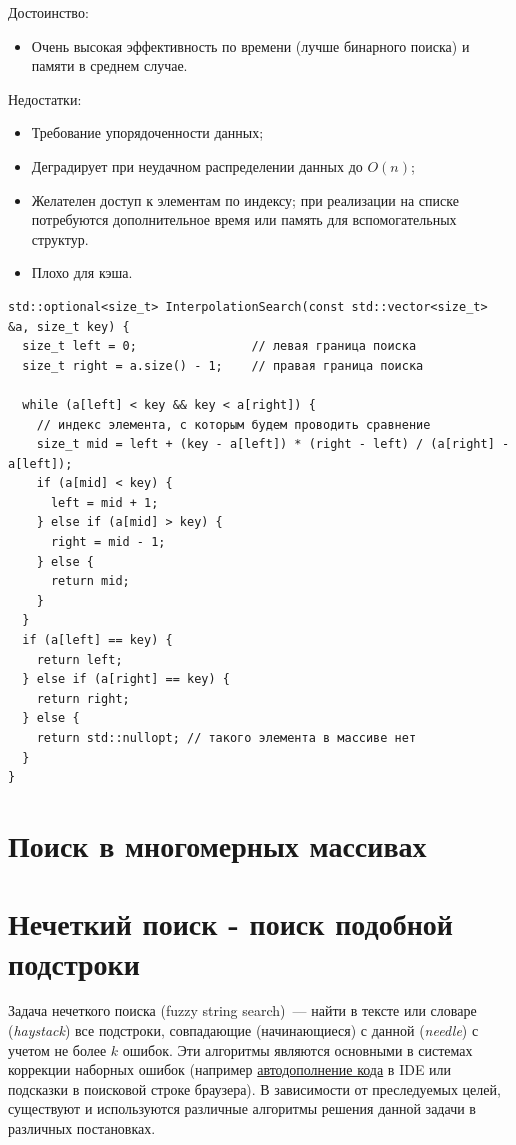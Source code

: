 Достоинство:
\begin{itemize}
  \item Очень высокая эффективность по времени (лучше бинарного поиска) и памяти  в среднем случае.
\end{itemize}
Недостатки:
\begin{itemize}
  \item Требование упорядоченности данных; 
  \item Деградирует при неудачном распределении данных до $O(n)$;
  \item Желателен доступ к элементам по индексу; при реализации на
  списке потребуются дополнительное время или память для
  вспомогательных структур.
  \item Плохо для кэша.
\end{itemize}

\begin{verbatim}
std::optional<size_t> InterpolationSearch(const std::vector<size_t> &a, size_t key) {
  size_t left = 0;                // левая граница поиска
  size_t right = a.size() - 1;    // правая граница поиска 

  while (a[left] < key && key < a[right]) {
    // индекс элемента, с которым будем проводить сравнение 
    size_t mid = left + (key - a[left]) * (right - left) / (a[right] - a[left]);
    if (a[mid] < key) {
      left = mid + 1;
    } else if (a[mid] > key) {
      right = mid - 1;
    } else {
      return mid;
    }
  }
  if (a[left] == key) {
    return left;
  } else if (a[right] == key) {
    return right;
  } else {
    return std::nullopt; // такого элемента в массиве нет
  }
}
\end{verbatim}

\section{Поиск в многомерных массивах}
\section{Нечеткий поиск - поиск подобной подстроки}
Задача нечеткого поиска (fuzzy string search)~--- найти в тексте или словаре (\textit{haystack}) все подстроки, совпадающие
(начинающиеся) с данной (\textit{needle}) с учетом не более \(k\) ошибок.
Эти алгоритмы являются основными в системах коррекции наборных ошибок
(например \href{https://en.wikipedia.org/wiki/Code_completion}{автодополнение кода} в IDE или подсказки в поисковой строке браузера).
В зависимости от преследуемых целей, существуют и используются различные алгоритмы решения данной задачи в различных постановках.

